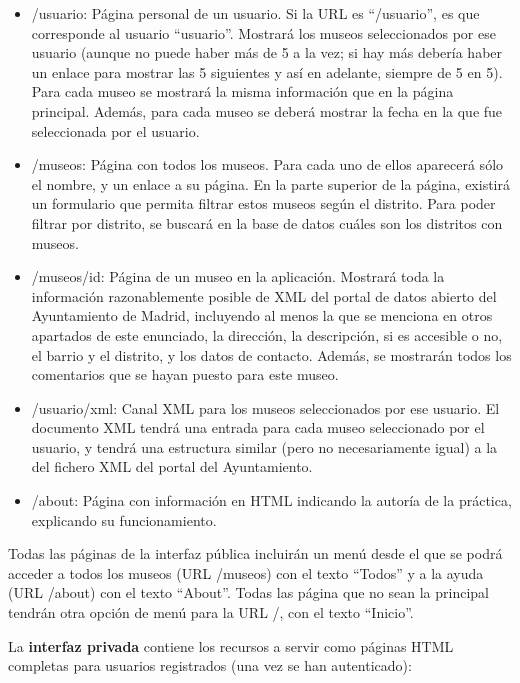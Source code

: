 \begin{itemize}
  \item /{usuario}: Página personal de un usuario. Si la URL es ``/usuario'', es que corresponde al usuario ``usuario''. Mostrará los museos seleccionados por ese usuario (aunque no puede haber más de 5 a la vez; si hay más debería haber un enlace para mostrar las 5 siguientes y así en adelante, siempre de 5 en 5). Para cada museo se mostrará la misma información que en la página principal. Además, para cada museo se deberá mostrar la fecha en la que fue seleccionada por el usuario.

  \item /museos: Página con todos los museos. Para cada uno de ellos aparecerá sólo el nombre, y un enlace a su página. En la parte superior de la página, existirá un formulario que permita filtrar estos museos según el distrito. Para poder filtrar por distrito, se buscará en la base de datos cuáles son los distritos con museos.

  \item /museos/{id}: Página de un museo en la aplicación. Mostrará toda la información razonablemente posible de XML del portal de datos abierto del Ayuntamiento de Madrid, incluyendo al menos la que se menciona en otros apartados de este enunciado, la dirección, la descripción, si es accesible o no, el barrio y el distrito, y los datos de contacto. Además, se mostrarán todos los comentarios que se hayan puesto para este museo.
  
  \item /{usuario}/xml: Canal XML para los museos seleccionados por ese usuario. El documento XML tendrá una entrada para cada museo seleccionado por el usuario, y tendrá una estructura similar (pero no necesariamente igual) a la del fichero XML del portal del Ayuntamiento.

  \item /about: Página con información en HTML indicando la autoría de la práctica, explicando su funcionamiento.

\end{itemize}

Todas las páginas de la interfaz pública incluirán un menú desde el que se podrá acceder a todos los museos (URL /museos) con el texto ``Todos'' y a la ayuda (URL /about) con el texto ``About''. Todas las página que no sean la principal tendrán otra opción de menú para la URL /, con el texto ``Inicio''.

La {\bf interfaz privada} contiene los recursos a servir como páginas HTML completas para usuarios registrados (una vez se han autenticado):

